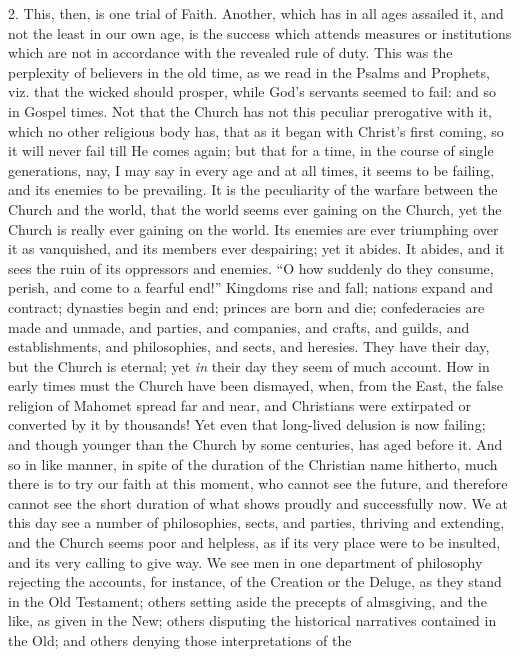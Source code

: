 2. This, then, is one trial of Faith. Another, which has in all
ages assailed it, and not the least in our own age, is the success
which attends measures or institutions which are not in accordance
with the revealed rule of duty. This was the perplexity of believers
in the old time, as we read in the Psalms and Prophets, viz. that the
wicked should prosper, while God's servants seemed to fail: and so in
Gospel times. Not that the Church has not this peculiar prerogative
with it, which no other religious body has, that as it began with
Christ's first coming, so it will never fail till He comes again; but
that for a time, in the course of single generations, nay, I may say
in every age and at all times, it seems to be failing, and its enemies
to be prevailing. It is the peculiarity of the warfare between the
Church and the world, that the world seems ever gaining on the Church,
yet the Church is really ever gaining on the world. Its enemies are
ever triumphing over it as vanquished, and its members ever
despairing; yet it abides. It abides, and it sees the ruin of its
oppressors and enemies. ``O how suddenly do they consume, perish,
and come to a fearful end!'' Kingdoms rise and fall; nations
expand and contract; dynasties begin and end; princes are born and
die; confederacies are made and unmade, and parties, and companies,
and crafts, and guilds, and establishments, and philosophies, and
sects, and heresies. They have their day, but the Church is eternal;
yet \emph{in} their day they seem of much account. How in early times must
the Church have been dismayed, when, from the East, the false religion
of Mahomet spread far and near, and Christians were extirpated or
converted by it by thousands! Yet even that long-lived delusion is now
failing; and though younger than the Church by some centuries, has
aged before it. And so in like manner, in spite of the duration of the
Christian name hitherto, much there is to try our faith at this
moment, who cannot see the future, and therefore cannot see the short
duration of what shows proudly and successfully now. We at this day
see a number of philosophies, sects, and parties, thriving and
extending, and the Church seems poor and helpless, as if its very
place were to be insulted, and its very calling to give way. We see
men in one department of philosophy rejecting the accounts, for
instance, of the Creation or the Deluge, as they stand in the Old
Testament; others setting aside the precepts of almsgiving, and the
like, as given in the New; others disputing the historical narratives
contained in the Old; and others denying those interpretations of the
